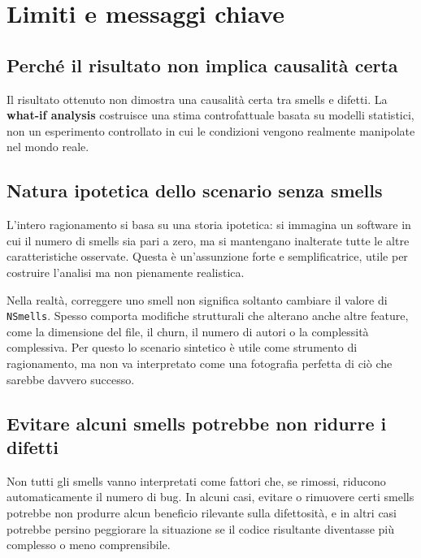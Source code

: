 \section{Limiti e messaggi chiave}

\subsection{Perché il risultato non implica causalità certa}

Il risultato ottenuto non dimostra una causalità certa tra smells e difetti. La \textbf{what-if analysis} costruisce una stima controfattuale basata su modelli statistici, non un esperimento controllato in cui le condizioni vengono realmente manipolate nel mondo reale.

\subsection{Natura ipotetica dello scenario senza smells}

L'intero ragionamento si basa su una storia ipotetica: si immagina un software in cui il numero di smells sia pari a zero, ma si mantengano inalterate tutte le altre caratteristiche osservate. Questa è un'assunzione forte e semplificatrice, utile per costruire l'analisi ma non pienamente realistica.

\begin{notaprof}
Nella realtà, correggere uno smell non significa soltanto cambiare il valore di \texttt{NSmells}. Spesso comporta modifiche strutturali che alterano anche altre feature, come la dimensione del file, il churn, il numero di autori o la complessità complessiva. Per questo lo scenario sintetico è utile come strumento di ragionamento, ma non va interpretato come una fotografia perfetta di ciò che sarebbe davvero successo.
\end{notaprof}

\subsection{Evitare alcuni smells potrebbe non ridurre i difetti}

Non tutti gli smells vanno interpretati come fattori che, se rimossi, riducono automaticamente il numero di bug. In alcuni casi, evitare o rimuovere certi smells potrebbe non produrre alcun beneficio rilevante sulla difettosità, e in altri casi potrebbe persino peggiorare la situazione se il codice risultante diventasse più complesso o meno comprensibile.

